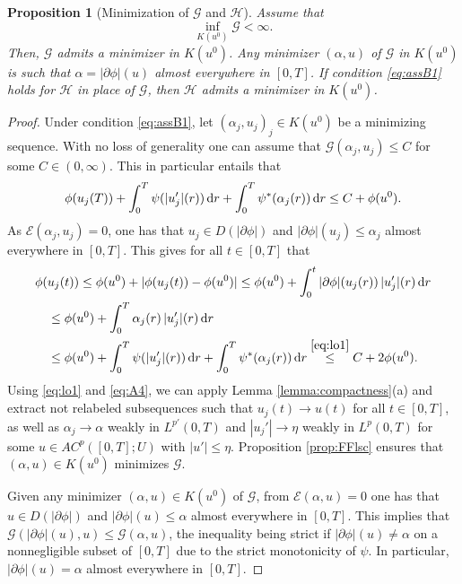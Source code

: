 \documentclass[reqno]{amsart}
\newcommand{\dr}{{\rm d} r}
\renewcommand{\sl}{|\partial \phi|}
\newcommand{\GG}{{\mathcal G}}
\newcommand{\EE}{{\mathcal E}}
\newcommand{\HH}{{\mathcal H}}
\newtheorem{proposition}[theorem]{Proposition}
\begin{document}
\begin{proposition}[Minimization of $\GG$ and
  $\HH$] \label{prop:min}  Assume that
  \begin{equation}\label{eq:assB1}
    \inf_{K(u^0)}\GG <\infty.
\end{equation}
Then, $\GG$ admits a minimizer in $K(u^0)$. Any
minimizer $(\alpha,u)$ of $\GG$  in $K(u^0)$
 is such that $\alpha = \sl (u)$ almost everywhere in
 $[0,T]$.
 If condition \eqref{eq:assB1} holds for $\HH$ in place of $\GG$, then $\HH$ admits a minimizer in $K(u^0)$.
\end{proposition}
\begin{proof}
Under
condition \eqref{eq:assB1}, let $(\alpha_j,u_j)_j\in K(u^0)$ be a minimizing sequence. With no loss of generality one can assume that $
\GG(\alpha_j , u_j) \leq  C$  for some  $C \in (0, \infty)$.  This in
particular entails that
\begin{equation}
  \phi(u_j(T)) +  \int_0^T \psi(|u_j'| (r))\, \dr +  \int_0^T
\psi^*(\alpha_j(r))\, \dr \leq  C  +
\phi(u^0). \label{eq:lo1}
  \end{equation}
As $\EE(\alpha_j,u_j)=0$, one has that $u_j \in D(\sl)$ and $\sl (u_j) \leq \alpha_j$
almost everywhere in $[0,T]$. This gives
  for all $t \in [0,T] $ that
  \begin{align*}
    &\phi(u_j(t)) \leq \phi(u^0) + |\phi(u_j(t)) - \phi(u^0)| \leq \phi(u^0) + 
      \int_0^t \sl(u_j(r))\, |u_j'|(r)\, \dr \\
      &\quad\leq \phi(u^0) +  \int_0^T \alpha_j(r)\, |u_j'|(r)\,
      \dr \\
    &\quad \leq \phi(u^0) + \int_0^T \psi(|u_j'|(r))\,\dr + 
      \int_0^T \psi^*(\alpha_j(r))\, \dr \stackrel{\eqref{eq:lo1}}{\leq}
       C   + 2\phi(u^0).
  \end{align*}
   Using \eqref{eq:lo1} and \eqref{eq:A4}, we can apply Lemma \ref{lemma:compactness}(a)  and extract not relabeled
 subsequences such that $u_j (t) \to u(t)$ for
all $t \in [0,T]$, as well as  $\alpha_j \to \alpha$ weakly in
$L^{p'}(0,T)$ and $|u_j'|\to \eta$ weakly in $L^p(0,T)$  for some $u \in AC^p([0,T];U)$ with $|u'| \le \eta$.  Proposition \ref{prop:FFlsc} ensures that
$(\alpha,u)\in K(u^0)$ minimizes $\GG $.
  
  Given any minimizer $(\alpha,u)\in K(u^0)$ of $\GG$, from
  $\EE(\alpha,u)=0$ one has that $u \in D(\sl)$ and $\sl
  (u)\leq \alpha$ almost everywhere in $[0,T]$. This implies that
  $\GG (\sl(u),u) \leq \GG(\alpha,u)$, the inequality being
  strict if $\sl(u)\not =\alpha$ on a nonnegligible subset of $[0,T]$
   due to the strict monotonicity of $\psi$.   In
  particular, $ \sl(u)=\alpha$ almost everywhere in $[0,T]$.


\end{proof}
\end{document}

